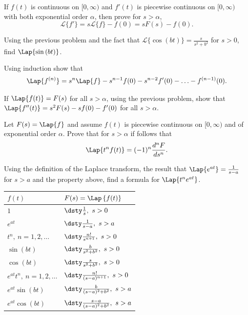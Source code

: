 \begin{enumerate}[resume]
\ii If $f(t)$ is continuous on $\lbrack 0, \infty )$ and $f'(t)$ is piecewise continuous on $\lbrack 0, \infty )$ with
both exponential order $\alpha$, then prove for $s > \alpha$,
\[ \mathscr{L} \{ f' \} = s \mathscr{L}\{ f \} - f(0) = sF(s)-f(0).\]

\vfill

\clearpage

\ii Using the previous problem and the fact that $\mathscr{L} \{ \cos{(bt)} \} = \frac{s}{s^2+b^2}$ for $s >0$, find
$\Lap \{ \sin{(bt)} \}$. \vfill

\ii Using induction show that
\[ \Lap \{ f^{(n)} \} = s^n \Lap \{ f \} - s^{n-1} f(0) - s^{n-2} f'(0) - \ldots - f^{(n-1)}(0).\] \vfill

\ii If $\Lap \{ f(t) \} = F(s)$ for all $s > \alpha$, using the previous problem, show that $\Lap \{ f''(t) \} =s^2F(s)-sf(0)-f'(0)$ for all $s > \alpha$. \vfill

\clearpage

\ii Let $F(s) = \Lap \{ f \}$ and assume $f(t)$ is piecewise continuous on $\lbrack 0, \infty )$ and of exponential order $\alpha$.
Prove that for $s > \alpha$ if follows that
\[ \Lap \{ t^nf(t) \} = (-1)^n \frac{d^nF}{ds^n}.\] \vfill


\ii Using the definition of the Laplace transform, the result that $\Lap \{ e^{at} \} = \frac{1}{s-a}$ for $s>a$ and the property above, find a formula for  $\Lap \{ t^n e^{at} \}$. \vfill
\end{enumerate}

\clearpage


\begin{center}
\begin{tabular}{|l|l|}
\hline
$f(t)$ & $F(s) = \Lap \left\{ f(t) \right\}$ \\
\hline
$1$ & $\dsty \frac{1}{s}, \ s > 0$\\
\hline
$e^{at}$ & $\dsty \frac{1}{s-a}, \ s > a$\\
\hline
$t^n, \ n=1,2, \ldots$ & $\dsty \frac{n!}{s^{n+1}}, \ s > 0$\\
\hline
$\sin{(bt)}$ & $\dsty \frac{b}{s^2+b^2}, \ s > 0$\\
\hline
$\cos{(bt)}$ & $\dsty \frac{s}{s^2+b^2}, \ s > 0$\\
\hline
$e^{at}t^n, \ n=1,2, \ldots$ & $\dsty \frac{n!}{(s-a)^{n+1}}, \ s > 0$\\
\hline
$e^{at}\sin{(bt)}$ & $\dsty \frac{b}{(s-a)^2+b^2}, \ s > a$\\
\hline
$e^{at}\cos{(bt)}$ & $\dsty \frac{s-a}{(s-a)^2+b^2}, \ s > a$\\
\hline
\end{tabular}
\end{center}


